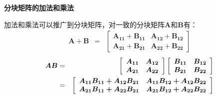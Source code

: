 \begin{enumerate} [1、]
		{\bf 分块矩阵的加法和乘法}
		
		加法和乘法可以推广到分块矩阵，对一致的分块矩阵$ \boldsymbol{A} $和$ \boldsymbol{B} $有：
		\vspace{-0em}
		\begin{eqnarray}
			\boldsymbol{A+B} & = & \left[\begin{array}{ll}
				\boldsymbol{A_{11}+B_{11}} & \boldsymbol{A_{12}+B_{12}} \\
				\boldsymbol{A_{21}+B_{21}} & \boldsymbol{A_{22}+B_{22}}
		\end{array}\right]
		\end{eqnarray}
		\begin{eqnarray}
			\boldsymbol{A B}  & = & \left[\begin{array}{ll}
				\boldsymbol{A_{11}} & \boldsymbol{A_{12}} \\
				\boldsymbol{A_{21}} & \boldsymbol{A_{22}}
		\end{array}\right]\left[\begin{array}{ll}
			\boldsymbol{B_{11}} & \boldsymbol{B_{12}} \\
			\boldsymbol{B_{21}} & \boldsymbol{B_{22}}
		\end{array}\right] \\ \notag
		& = & \left[\begin{array}{ll}
			\boldsymbol{A_{11} B_{11}+A_{12} B_{21}} & \boldsymbol{A_{11} B_{12}+A_{12} B_{22}} \\
			\boldsymbol{A_{21} B_{11}+A_{22} B_{21}} & \boldsymbol{A_{21} B_{12}+A_{22} B_{22}}
		\end{array}\right]
		\end{eqnarray}
		

\end{enumerate}
